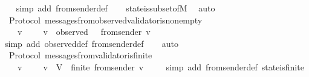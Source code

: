 \begin{isabellebody}
%
\isadelimproof
\ \ %
\endisadelimproof
%
\isatagproof
{}\isamarkupfalse%
\ {\isacharparenleft}simp\ add{\isacharcolon}\ from{\isacharunderscore}sender{\isacharunderscore}def{\isacharparenright}\isanewline
\ \ \isamarkupfalse%
\ state{\isacharunderscore}is{\isacharunderscore}subset{\isacharunderscore}of{\isacharunderscore}M\ \isamarkupfalse%
\ auto%
\endisatagproof
{\isafoldproof}%
%
\isadelimproof
\ \ \isanewline
%
\endisadelimproof
\isanewline
{}\isamarkupfalse%
\ {\isacharparenleft}\ Protocol{\isacharparenright}\ messages{\isacharunderscore}from{\isacharunderscore}observed{\isacharunderscore}validator{\isacharunderscore}is{\isacharunderscore}non{\isacharunderscore}empty\ {\isacharcolon}\isanewline
\ \ {\isachardoublequoteopen}{\isasymforall}\ {\isasymsigma}\ v{\isachardot}\ {\isasymsigma}\ {\isasymin}\ {\isasymSigma}\ {\isasymand}\ v\ {\isasymin}\ observed\ {\isasymsigma}\ {\isasymlongrightarrow}\ from{\isacharunderscore}sender\ {\isacharparenleft}v{\isacharcomma}\ {\isasymsigma}{\isacharparenright}\ {\isasymnoteq}\ {\isasymemptyset}{\isachardoublequoteclose}\isanewline
%
\isadelimproof
\ \ %
\endisadelimproof
%
\isatagproof
{}\isamarkupfalse%
\ {\isacharparenleft}simp\ add{\isacharcolon}\ observed{\isacharunderscore}def\ from{\isacharunderscore}sender{\isacharunderscore}def{\isacharparenright}\isanewline
\ \ \isamarkupfalse%
\ auto%
\endisatagproof
{\isafoldproof}%
%
\isadelimproof
\isanewline
%
\endisadelimproof
\isanewline
{}\isamarkupfalse%
\ {\isacharparenleft}\ Protocol{\isacharparenright}\ messages{\isacharunderscore}from{\isacharunderscore}validator{\isacharunderscore}is{\isacharunderscore}finite\ {\isacharcolon}\isanewline
\ \ {\isachardoublequoteopen}{\isasymforall}\ {\isasymsigma}\ v{\isachardot}\ {\isasymsigma}\ {\isasymin}\ {\isasymSigma}\ {\isasymand}\ v\ {\isasymin}\ V{\isasymsigma}\ {\isasymlongrightarrow}\ finite\ {\isacharparenleft}from{\isacharunderscore}sender\ {\isacharparenleft}v{\isacharcomma}\ {\isasymsigma}{\isacharparenright}{\isacharparenright}{\isachardoublequoteclose}\isanewline
%
\isadelimproof
\ \ %
\endisadelimproof
%
\isatagproof
{}\isamarkupfalse%
\ {\isacharparenleft}simp\ add{\isacharcolon}\ from{\isacharunderscore}sender{\isacharunderscore}def\ state{\isacharunderscore}is{\isacharunderscore}finite{\isacharparenright}%
\endisatagproof
{\isafoldproof}%
%
\isadelimproof
\isanewline
%
\endisadelimproof
\isanewline
\isanewline
{}\isamarkupfalse%

\end{isabellebody}
